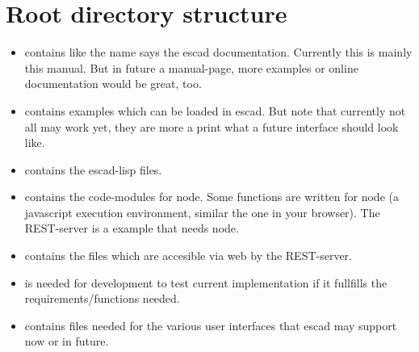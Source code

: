 \documentclass[a4paper, 12pt, openany]{scrbook}
\begin{document}
\section{Root directory structure}
\begin{itemize}
\item {} contains like the name says the escad documentation. Currently this is mainly this manual. But in future a manual-page, more examples or online documentation would be great, too.
\item {} contains examples which can be loaded in escad. But note that currently not all may work yet, they are more a print what a future interface should look like.
\item {} contains the escad-lisp files.
\item {} contains the code-modules for node. Some functions are written for node (a javascript execution environment, similar the one in your browser). The REST-server is a example that needs node.
\item {} contains the files which are accesible via web by the REST-server.
\item {} is needed for development to test current implementation if it fullfills the requirements/functions needed.
\item {} contains files needed for the various user interfaces that escad may support now or in future.
\end{itemize}
\end{document}
